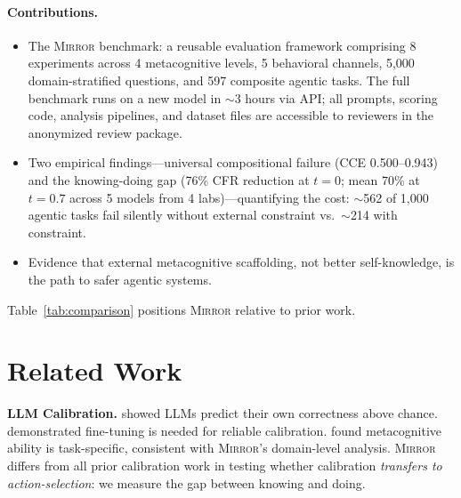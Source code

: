 \documentclass[10pt]{article}
\newcommand{\mirror}{\textsc{Mirror}}
\newcommand{\CCE}{CCE}
\newcommand{\CFR}{CFR}
\begin{document}
\paragraph{Contributions.}
\begin{itemize}
  \setlength\itemsep{2pt}
  \item The \mirror{} benchmark: a reusable evaluation framework comprising
        8 experiments across 4 metacognitive levels, 5 behavioral channels, 5,000
        domain-stratified questions, and 597 composite agentic tasks. The full
        benchmark runs on a new model in $\sim$3 hours via API; all prompts,
        scoring code, analysis pipelines, and dataset files are accessible to
        reviewers in the anonymized review package.
  \item Two empirical findings---universal compositional failure
        (\CCE{} 0.500--0.943) and the knowing-doing gap (76\% \CFR{}
        reduction at $t\!=\!0$; mean 70\% at $t\!=\!0.7$ across 5 models from 4 labs)---quantifying the cost:
        $\sim$562 of 1,000 agentic tasks fail silently without external
        constraint vs.\ $\sim$214 with constraint.
  \item Evidence that external metacognitive scaffolding, not better
        self-knowledge, is the path to safer agentic systems.
\end{itemize}

Table~\ref{tab:comparison} positions \mirror{} relative to prior work.



\section{Related Work}
\label{sec:related}

\textbf{LLM Calibration.}
\citet{kadavath2022language} showed LLMs predict their own correctness above chance. \citet{kapoor2024calibration} demonstrated fine-tuning is needed for reliable calibration. \citet{steyvers2025calibration} found metacognitive ability is task-specific, consistent with \mirror{}'s domain-level analysis. \mirror{} differs from all prior calibration work in testing whether calibration \textit{transfers to action-selection}: we measure the gap between knowing and doing.
\end{document}
